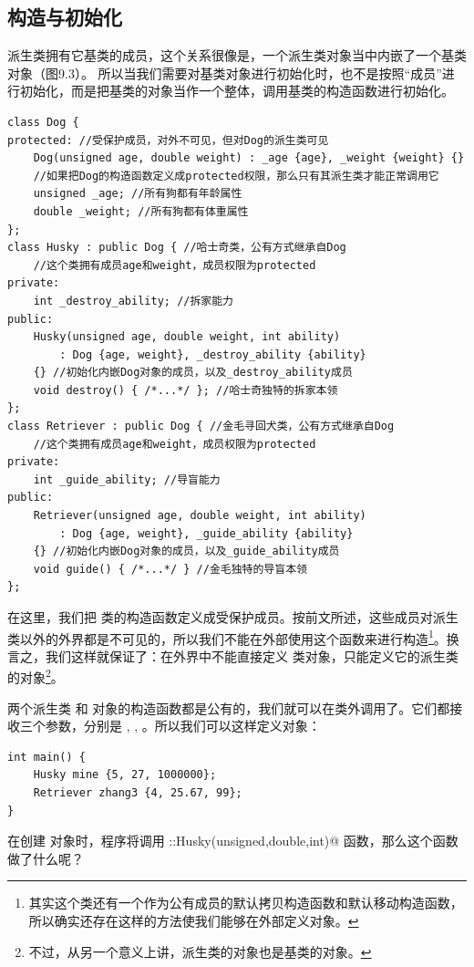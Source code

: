 \subsection*{构造与初始化}
派生类拥有它基类的成员，这个关系很像是，一个派生类对象当中内嵌了一个基类对象（图9.3）。
所以当我们需要对基类对象进行初始化时，也不是按照``成员''进行初始化，而是把基类的对象当作一个整体，调用基类的构造函数进行初始化。\par
\begin{lstlisting}
class Dog {
protected: //受保护成员，对外不可见，但对Dog的派生类可见
    Dog(unsigned age, double weight) : _age {age}, _weight {weight} {}
    //如果把Dog的构造函数定义成protected权限，那么只有其派生类才能正常调用它
    unsigned _age; //所有狗都有年龄属性
    double _weight; //所有狗都有体重属性
};
class Husky : public Dog { //哈士奇类，公有方式继承自Dog
    //这个类拥有成员age和weight，成员权限为protected
private:
    int _destroy_ability; //拆家能力
public:
    Husky(unsigned age, double weight, int ability)
        : Dog {age, weight}, _destroy_ability {ability}
    {} //初始化内嵌Dog对象的成员，以及_destroy_ability成员
    void destroy() { /*...*/ }; //哈士奇独特的拆家本领
};
class Retriever : public Dog { //金毛寻回犬类，公有方式继承自Dog
    //这个类拥有成员age和weight，成员权限为protected
private:
    int _guide_ability; //导盲能力
public:
    Retriever(unsigned age, double weight, int ability)
        : Dog {age, weight}, _guide_ability {ability}
    {} //初始化内嵌Dog对象的成员，以及_guide_ability成员
    void guide() { /*...*/ } //金毛独特的导盲本领
};
\end{lstlisting}\par
在这里，我们把 \lstinline@Dog@ 类的构造函数定义成受保护成员。按前文所述，这些成员对派生类以外的外界都是不可见的，所以我们不能在外部使用这个函数来进行构造\footnote{其实这个类还有一个作为公有成员的默认拷贝构造函数和默认移动构造函数，所以确实还存在这样的方法使我们能够在外部定义对象。}。换言之，我们这样就保证了：在外界中不能直接定义 \lstinline@Dog@ 类对象，只能定义它的派生类的对象\footnote{不过，从另一个意义上讲，派生类的对象也是基类的对象。}。\par
两个派生类 \lstinline@Husky@ 和 \lstinline@Retriever@ 对象的构造函数都是公有的，我们就可以在类外调用了。它们都接收三个参数，分别是 \lstinline@age@, \lstinline@weight@, \lstinline@ability@。所以我们可以这样定义对象：
\begin{lstlisting}
int main() {
    Husky mine {5, 27, 1000000};
    Retriever zhang3 {4, 25.67, 99};
}
\end{lstlisting}
在创建 \lstinline@mine@ 对象时，程序将调用 \lstinline@Husky::Husky(unsigned,double,int)@ 函数，那么这个函数做了什么呢？
